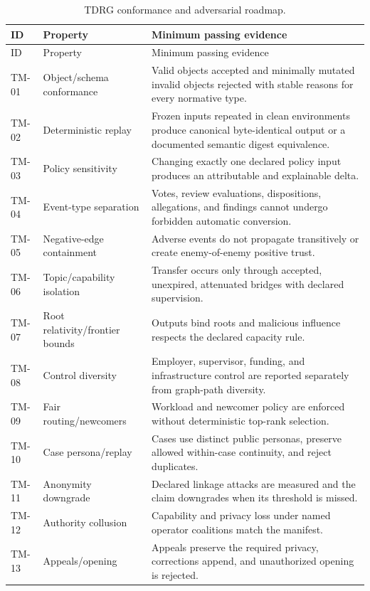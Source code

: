 \documentclass[11pt]{article}
\begin{document}
\begin{longtable}{p{}p{}p{}}
\caption{TDRG conformance and adversarial roadmap.}\label{tab:matrix}\\
\toprule ID & Property & Minimum passing evidence \\
\midrule
\endfirsthead
\toprule ID & Property & Minimum passing evidence \\
\midrule
\endhead
TM-01 & Object/schema conformance & Valid objects accepted and minimally mutated invalid objects rejected with stable reasons for every normative type. \\
TM-02 & Deterministic replay & Frozen inputs repeated in clean environments produce canonical byte-identical output or a documented semantic digest equivalence. \\
TM-03 & Policy sensitivity & Changing exactly one declared policy input produces an attributable and explainable delta. \\
TM-04 & Event-type separation & Votes, review evaluations, dispositions, allegations, and findings cannot undergo forbidden automatic conversion. \\
TM-05 & Negative-edge containment & Adverse events do not propagate transitively or create enemy-of-enemy positive trust. \\
TM-06 & Topic/capability isolation & Transfer occurs only through accepted, unexpired, attenuated bridges with declared supervision. \\
TM-07 & Root relativity/frontier bounds & Outputs bind roots and malicious influence respects the declared capacity rule. \\
TM-08 & Control diversity & Employer, supervisor, funding, and infrastructure control are reported separately from graph-path diversity. \\
TM-09 & Fair routing/newcomers & Workload and newcomer policy are enforced without deterministic top-rank selection. \\
TM-10 & Case persona/replay & Cases use distinct public personas, preserve allowed within-case continuity, and reject duplicates. \\
TM-11 & Anonymity downgrade & Declared linkage attacks are measured and the claim downgrades when its threshold is missed. \\
TM-12 & Authority collusion & Capability and privacy loss under named operator coalitions match the manifest. \\
TM-13 & Appeals/opening & Appeals preserve the required privacy, corrections append, and unauthorized opening is rejected. \\

\end{longtable}
\end{document}
